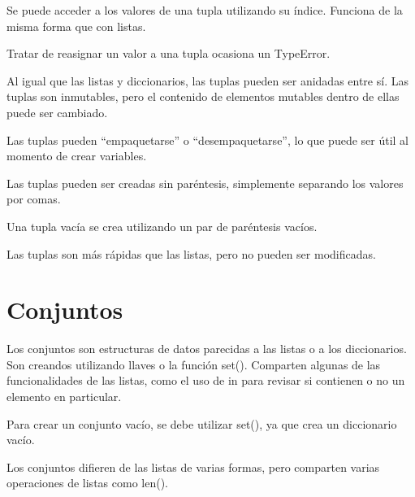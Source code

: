 \documentclass{report}
\newcommand{\doble}[1]{``#1''}
\begin{document}

Se puede acceder a los valores de una tupla utilizando su índice. Funciona de la misma forma que con listas.


Tratar de reasignar un valor a una tupla ocasiona un TypeError.


Al igual que las listas y diccionarios, las tuplas pueden ser anidadas entre sí.
Las tuplas son inmutables, pero el contenido de elementos mutables dentro de ellas puede ser cambiado.


Las tuplas pueden \doble{empaquetarse} o \doble{desempaquetarse}, lo que puede ser útil al momento de crear variables.


Las tuplas pueden ser creadas sin paréntesis, simplemente separando los valores por comas.


Una tupla vacía se crea utilizando un par de paréntesis vacíos.


Las tuplas son más rápidas que las listas, pero no pueden ser modificadas.


\section{Conjuntos}

Los conjuntos son estructuras de datos parecidas a las listas o a los diccionarios. Son creandos utilizando llaves o la función set(). Comparten algunas de las funcionalidades de las listas, como el uso de in para revisar si contienen o no un elemento en particular.


Para crear un conjunto vacío, se debe utilizar set(), ya que {} crea un diccionario vacío.


Los conjuntos difieren de las listas de varias formas, pero comparten varias operaciones de listas como len().\smallskip
\end{document}
